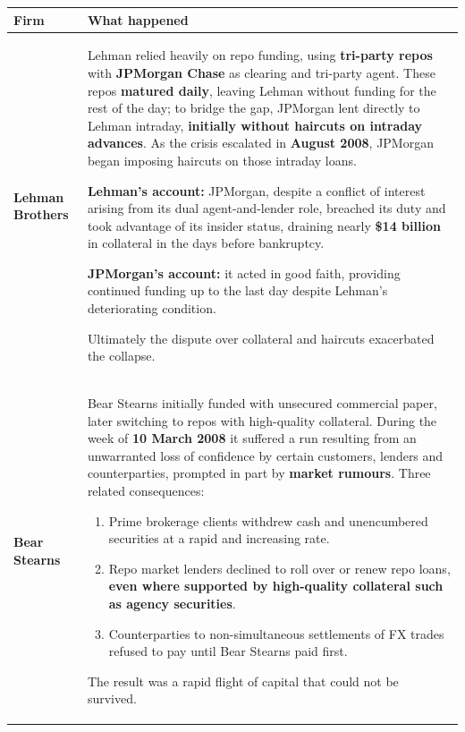 \begin{center}
\small
\begin{tabularx}{\textwidth}{@{}p{2.6cm} X@{}}
\toprule
\rowcolor{FRMSoft}\textbf{Firm} & \textbf{What happened} \\
\midrule
\textbf{Lehman Brothers} &
Lehman relied heavily on repo funding, using \textbf{tri-party repos} with \textbf{JPMorgan Chase} as clearing and tri-party agent. These repos \textbf{matured daily}, leaving Lehman without funding for the rest of the day; to bridge the gap, JPMorgan lent directly to Lehman intraday, \textbf{initially without haircuts on intraday advances}. As the crisis escalated in \textbf{August 2008}, JPMorgan began imposing haircuts on those intraday loans.

\textbf{Lehman's account:} JPMorgan, despite a conflict of interest arising from its dual agent-and-lender role, breached its duty and took advantage of its insider status, draining nearly \textbf{\$14 billion} in collateral in the days before bankruptcy.

\textbf{JPMorgan's account:} it acted in good faith, providing continued funding up to the last day despite Lehman's deteriorating condition.

Ultimately the dispute over collateral and haircuts exacerbated the collapse. \\
\addlinespace
\textbf{Bear Stearns} &
Bear Stearns initially funded with unsecured commercial paper, later switching to repos with high-quality collateral. During the week of \textbf{10 March 2008} it suffered a run resulting from an unwarranted loss of confidence by certain customers, lenders and counterparties, prompted in part by \textbf{market rumours}. Three related consequences:
\begin{enumerate}
\item Prime brokerage clients withdrew cash and unencumbered securities at a rapid and increasing rate.
\item Repo market lenders declined to roll over or renew repo loans, \textbf{even where supported by high-quality collateral such as agency securities}.
\item Counterparties to non-simultaneous settlements of FX trades refused to pay until Bear Stearns paid first.
\end{enumerate}
The result was a rapid flight of capital that could not be survived. \\
\bottomrule
\end{tabularx}
\end{center}

